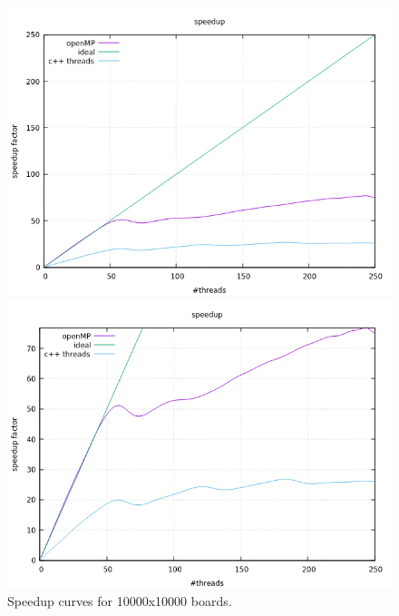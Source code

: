 \documentclass[a4paper,10pt]{article}
\begin{document}
		\begin{figure}[H]
		\centering
		\begin{minipage}[t]{0.55\linewidth}
			\includegraphics[width=\linewidth]{BenchMarkGOL/speedup/10000/graph10000.png}
		\end{minipage}%
		\begin{minipage}[t]{0.55\linewidth}
			\includegraphics[width=\linewidth]{BenchMarkGOL/speedup/10000/graph10000_zoom.png}
		\end{minipage}
		\caption{Speedup curves for 10000x10000 boards.}
		\label{10000}
	\end{figure}
\end{document}
